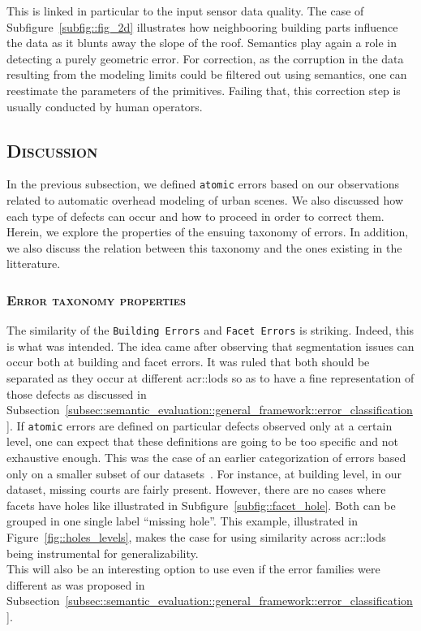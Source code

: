                This is linked in particular to the input sensor data quality.
                The case of Subfigure~\ref{subfig::fig_2d} illustrates how neighbooring building parts influence the data as it blunts away the slope of the roof.
                Semantics play again a role in detecting a purely geometric error.
                For correction, as the corruption in the data resulting from the modeling limits could be filtered out using semantics, one can reestimate the parameters of the primitives.
                Failing that, this correction step is usually conducted by human operators.

    \subsection{\textsc{Discussion}}
        \label{subsec::semantic_evaluation::overhead::discussion}

        In the previous subsection, we defined \texttt{atomic} errors based on our observations related to automatic overhead modeling of urban scenes.
        We also discussed how each type of defects can occur and how to proceed in order to correct them.
        Herein, we explore the properties of the ensuing taxonomy of errors.
        In addition, we also discuss the relation between this taxonomy and the ones existing in the litterature.

        \subsubsection{\textsc{Error taxonomy properties}}
            The similarity of the \texttt{Building Errors} and \texttt{Facet Errors} is striking.
            Indeed, this is what was intended.
            The idea came after observing that segmentation issues can occur both at building and facet errors.
            It was ruled that both should be separated as they occur at different \glspl{acr::lod} so as to have a fine representation of those defects as discussed in Subsection~\ref{subsec::semantic_evaluation::general_framework::error_classification}.
            If \texttt{atomic} errors are defined on particular defects observed only at a certain level, one can expect that these definitions are going to be too specific and not exhaustive enough.
            This was the case of an earlier categorization of errors based only on a smaller subset of our datasets~\parencite{ennafii2018semanticunannotated}.
            For instance, at building level, in our dataset, missing courts are fairly present.
            However, there are no cases where facets have holes like illustrated in Subfigure~\ref{subfig::facet_hole}.
            Both can be grouped in one single label ``missing hole''.
            This example, illustrated in Figure~\ref{fig::holes_levels}, makes the case for using similarity across \glspl{acr::lod} being instrumental for generalizability.\\
            This will also be an interesting option to use even if the error families were different as was proposed in Subsection~\ref{subsec::semantic_evaluation::general_framework::error_classification}.\\


